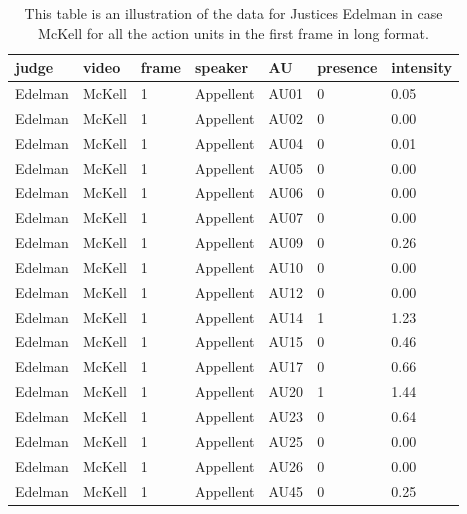 \documentclass{monashthesis}
\begin{document}
\begin{table}[ht]
\begin{center}
\caption{\label{tab:long} This table is an illustration of the data for Justices Edelman in case McKell for all the action units in the first frame in long format.}
\begin{tabular}{lllllll}
\toprule
judge & video & frame & speaker & AU & presence & intensity \\
\midrule
Edelman & McKell & 1 & Appellent & AU01 & 0 & 0.05 \\
Edelman & McKell & 1 & Appellent & AU02 & 0 & 0.00 \\
Edelman & McKell & 1 & Appellent & AU04 & 0 & 0.01 \\
Edelman & McKell & 1 & Appellent & AU05 & 0 & 0.00 \\
Edelman & McKell & 1 & Appellent & AU06 & 0 & 0.00 \\
Edelman & McKell & 1 & Appellent & AU07 & 0 & 0.00 \\
Edelman & McKell & 1 & Appellent & AU09 & 0 & 0.26 \\
Edelman & McKell & 1 & Appellent & AU10 & 0 & 0.00 \\
Edelman & McKell & 1 & Appellent & AU12 & 0 & 0.00 \\
Edelman & McKell & 1 & Appellent & AU14 & 1 & 1.23 \\
Edelman & McKell & 1 & Appellent & AU15 & 0 & 0.46 \\
Edelman & McKell & 1 & Appellent & AU17 & 0 & 0.66 \\
Edelman & McKell & 1 & Appellent & AU20 & 1 & 1.44 \\
Edelman & McKell & 1 & Appellent & AU23 & 0 & 0.64 \\
Edelman & McKell & 1 & Appellent & AU25 & 0 & 0.00 \\
Edelman & McKell & 1 & Appellent & AU26 & 0 & 0.00 \\
Edelman & McKell & 1 & Appellent & AU45 & 0 & 0.25 \\
\bottomrule
\end{tabular}
\end{center}
\end{table}
\end{document}
